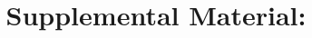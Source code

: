 \documentclass[aps,prl,reprint,onecolumn,11pt,tightenlines,floatfix]{revtex4-2}
\begin{document}
\raggedbottom\title{Supplemental Material: \ManuscriptTitle}\maketitle\LayoutAudit

\end{document}
